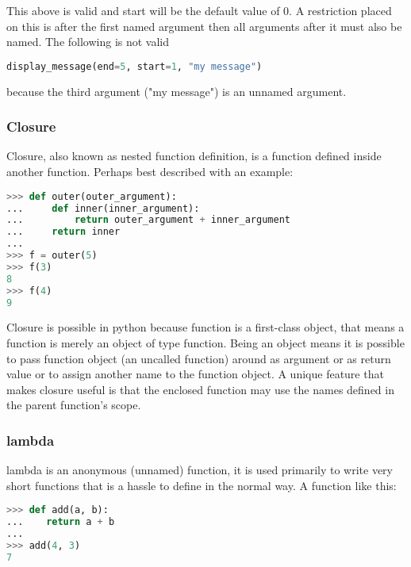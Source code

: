 This above is valid and start will be the default value of 0. A restriction
placed on this is after the first named argument then all arguments after it
must also be named. The following is not valid
\lstset{basicstyle=\scriptsize, numbers=left, captionpos=b, tabsize=4}
\begin{lstlisting}[caption=Invalid use,language={Python},
xleftmargin=15pt, label=lst:invaliduse]
display_message(end=5, start=1, "my message")
\end{lstlisting}
because the third argument ("my message") is an unnamed argument.

\subsubsection{Closure}
Closure, also known as nested function definition, is a function defined inside
another function. Perhaps best described with an example:
\lstset{basicstyle=\scriptsize, numbers=left, captionpos=b, tabsize=4}
\begin{lstlisting}[caption=Closures,language={Python},
xleftmargin=15pt, label=lst:]
>>> def outer(outer_argument):
...     def inner(inner_argument):
...         return outer_argument + inner_argument
...     return inner
...
>>> f = outer(5)
>>> f(3)
8
>>> f(4)
9
\end{lstlisting}

Closure is possible in python because function is a first-class object, that
means a function is merely an object of type function. Being an object means it
is possible to pass function object (an uncalled function) around as argument or
as return value or to assign another name to the function object. A unique
feature that makes closure useful is that the enclosed function may use the
names defined in the parent function's scope.

\subsubsection{lambda}
lambda is an anonymous (unnamed) function, it is used primarily to write very
short functions that is a hassle to define in the normal way. A function like
this:
\lstset{basicstyle=\scriptsize, numbers=left, captionpos=b, tabsize=4}
\begin{lstlisting}[caption=lambda usecase,language={Python},
xleftmargin=15pt, label=lst:lambdausecase]
>>> def add(a, b):
...    return a + b
...
>>> add(4, 3)
7
\end{lstlisting}

